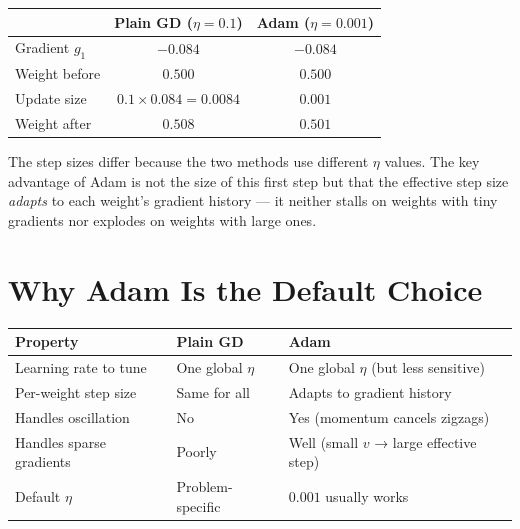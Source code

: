 \documentclass[12pt, a4paper]{article}
\begin{document}
\begin{center}
  \renewcommand{\arraystretch}{1.4}
  \begin{tabular}{lcc}
    \toprule
                   & Plain GD ($\eta = 0.1$)     & Adam ($\eta = 0.001$) \\
    \midrule
    Gradient $g_1$ & $-0.084$                    & $-0.084$              \\
    Weight before  & $0.500$                     & $0.500$               \\
    Update size    & $0.1 \times 0.084 = 0.0084$ & $0.001$               \\
    Weight after   & $0.508$                     & $0.501$               \\
    \bottomrule
  \end{tabular}
\end{center}

The step sizes differ because the two methods use different $\eta$ values.
The key advantage of Adam is not the size of this first step but that the
effective step size \emph{adapts} to each weight's gradient history ---
it neither stalls on weights with tiny gradients nor explodes on weights
with large ones.

\section{Why Adam Is the Default Choice}

\begin{center}
  \renewcommand{\arraystretch}{1.3}
  \begin{tabular}{lll}
    \toprule
    Property                 & Plain GD          & Adam                                    \\
    \midrule
    Learning rate to tune    & One global $\eta$ & One global $\eta$ (but less sensitive)  \\
    Per-weight step size     & Same for all      & Adapts to gradient history              \\
    Handles oscillation      & No                & Yes (momentum cancels zigzags)          \\
    Handles sparse gradients & Poorly            & Well (small $v$ → large effective step) \\
    Default $\eta$           & Problem-specific  & $0.001$ usually works                   \\
    \bottomrule
  \end{tabular}
\end{center}
\end{document}
